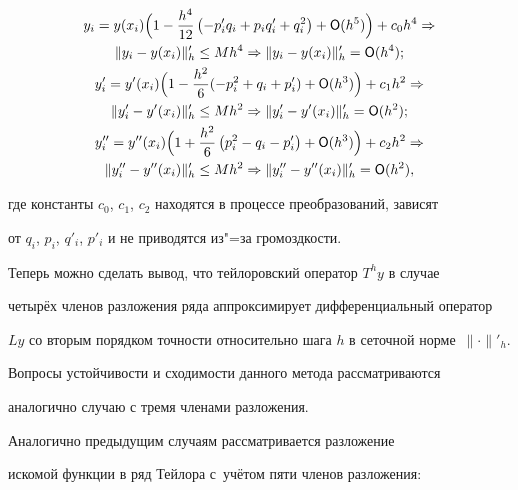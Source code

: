 \begin{gather*}

y_i =y(x_i)\Bigl(1-\frac{h^4}{12} \left(-p'_i q_i +p_i q'_i +q_i^2 \right)+{\sf O}(h^5) \Bigr)+c_0

h^4\Rightarrow \\ 

\| y_i -y(x_i )\|'_h \le Mh^4 \Rightarrow  \| y_i -y(x_i )\|'_h ={\sf O}(h^4); \\

y'_i =y'(x_i )\Bigl(1- \frac{h^2}{6}(-p_i^2 +q_i +p'_i

)+{\sf O}(h^3)\Bigr)+c_1 h^2\Rightarrow \\ 

\| y'_i -y'(x_i )\|'_h \le Mh^2\Rightarrow \| y'_i -y'(x_i )\|'_h ={\sf O}(h^2);\\

y''_i =y''(x_i ) \Bigl(1+\frac{h^2}{6}\left(p_i^2 -q_i -p'_i \right)+{\sf O}(h^3)\Bigr)+c_2

h^2\Rightarrow \\ 

\| y''_i -y''(x_i )\|'_h \le Mh^2 \Rightarrow \| y''_i -y''(x_i )\|'_h ={\sf O}(h^2),

\end{gather*}

где константы $c_0$, $c_1$, $c_2$ находятся в процессе преобразований, зависят

от $q_i$, $p_i$, $q'_i$, $p'_i$ и не приводятся из"=за громоздкости.



Теперь можно сделать вывод, что тейлоровский оператор $T^hy$ в случае

четырёх членов разложения ряда аппроксимирует дифференциальный оператор

$Ly$ со вторым порядком точности относительно шага $h$ в сеточной \mbox{норме $\| \cdot \|'_h$.}



Вопросы устойчивости и сходимости данного метода рассматриваются

аналогично случаю с тремя членами разложения.



\smallskip




Аналогично предыдущим случаям рассматривается разложение

искомой функции в ряд Тейлора с~учётом пяти членов разложения:


